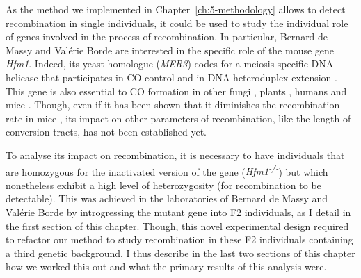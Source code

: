\newpage



\begin{mccorrection}
As the method we implemented in Chapter~\ref{ch:5-methodology} allows to detect recombination in single individuals, it could be used to study the individual role of genes involved in the process of recombination.
In particular, Bernard de Massy and Valérie Borde are interested in the specific role of the mouse gene \textit{Hfm1}.
Indeed, its yeast homologue (\textit{MER3}) codes for a meiosis-specific DNA helicase \citep{nakagawa1999saccharomyces,nakagawa2002saccharomyces} that participates in CO control and in DNA heteroduplex extension \citep{mazina2004saccharomyces,nakagawa2002mer3}.
This gene is also essential to CO formation in other fungi \citep{sugawara2009coprinus}, plants \citep{mercier2005two,chen2005arabidopsis}, humans \citep{tanaka2006hfm1} and mice \citep{guiraldelli2013mouse}.
Though, even if it has been shown that it diminishes the recombination rate in mice \citep{guiraldelli2013mouse}, its impact on other parameters of recombination, like the length of conversion tracts, has not been established yet.

To analyse its impact on recombination, it is necessary to have individuals that are homozygous for the inactivated version of the gene (\textit{Hfm1\textsuperscript{-/-}}) but which nonetheless exhibit a high level of heterozygosity (for recombination to be detectable).
This was achieved in the laboratories of Bernard de Massy and Valérie Borde by introgressing the mutant gene into F2 individuals, as I detail in the first section of this chapter.
Though, this novel experimental design required to refactor our method to study recombination in these F2 individuals containing a third genetic background. 
I thus describe in the last two sections of this chapter how we worked this out and what the primary results of this analysis were.

%
%
%

\end{mccorrection}

